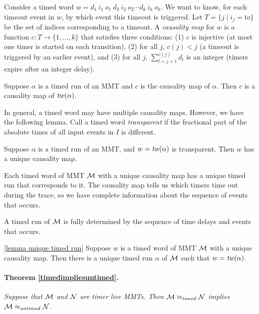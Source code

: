 Consider a timed word
$w  =   d_1 ~ i_1 ~ o_1 ~ d_2 ~ i_2 ~ o_2 \cdots d_k ~ i_k ~ o_k$.
We want to know, for each timeout event in $w$, by which event this timeout is triggered.
Let $T = \{ j \mid i_j = \mathit{to} \}$ be the set of indices corresponding to a timeout.
A \emph{causality map} for $w$ is a function $c: T \rightarrow \{ 1 ,\ldots, k \}$ that satisfies three conditions:
(1)
$c$ is injective (at most one timer is started on each transition),
(2)
for all $j$, $c(j) < j$ (a timeout is triggered by an earlier event), and
(3)
for all $j$, $\sum_{l=j+1}^{c(j)} d_l$ is an integer (timers expire after an integer delay).

\begin{lemma}
\label{causality map run is causility map of its timed word}
Suppose $\alpha$ is a timed run of an MMT and $c$ is the causality map of $\alpha$. 
Then $c$ is a causality map of $\mathit{tw}(\alpha)$.
\end{lemma}

In general, a timed word may have multiple causality maps.
However, we have the following lemma.
Call a timed word \emph{transparent} if the fractional part of the absolute times of all input events in $I$ is different.

\begin{lemma}
\label{lemma unique causality map}
Suppose $\alpha$ is a timed run of an MMT, and $w =  \mathit{tw}(\alpha)$ is transparent. 
Then $w$ has a unique causality map.
\end{lemma}

Each timed word of MMT ${\mathcal M}$ with a unique causality map has a unique timed run that corresponds to it.
The causality map tells us which timers time out during the trace, so we have complete information
about the sequence of events that occurs. 

A timed run of ${\mathcal M}$ is fully determined
by the sequence of time delays and events that occurs.

\begin{lemma}
\ref{lemma unique timed run}
Suppose $w$ is a timed word of MMT ${\mathcal M}$ with a unique causality map.
Then there is a unique timed run $\alpha$ of ${\mathcal M}$ such that $w = \mathit{tw}(\alpha)$.
\end{lemma}


\paragraph{Theorem \ref{timedimpliesuntimed}.}
\emph{Suppose that ${\mathcal M}$ and ${\mathcal N}$ are timer live MMTs. Then
${\mathcal M} \approx_{\mathit{timed}} {\mathcal N}$
implies
${\mathcal M} \approx_{\mathit{untimed}} {\mathcal N}$.}

